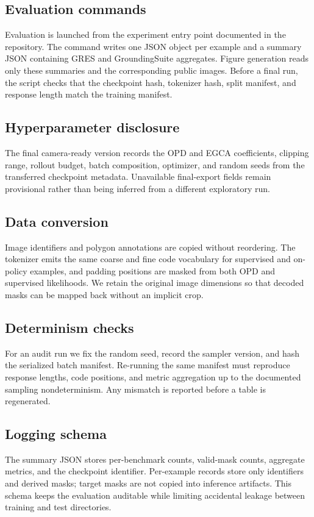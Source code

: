 \documentclass{article}
\begin{document}
\subsection{Evaluation commands}Evaluation is launched from the experiment entry point documented in the repository. The command writes one JSON object per example and a summary JSON containing GRES and GroundingSuite aggregates. Figure generation reads only these summaries and the corresponding public images. Before a final run, the script checks that the checkpoint hash, tokenizer hash, split manifest, and response length match the training manifest.
\subsection{Hyperparameter disclosure}The final camera-ready version records the OPD and EGCA coefficients, clipping range, rollout budget, batch composition, optimizer, and random seeds from the transferred checkpoint metadata. Unavailable final-export fields remain provisional rather than being inferred from a different exploratory run.
\subsection{Data conversion}Image identifiers and polygon annotations are copied without reordering. The tokenizer emits the same coarse and fine code vocabulary for supervised and on-policy examples, and padding positions are masked from both OPD and supervised likelihoods. We retain the original image dimensions so that decoded masks can be mapped back without an implicit crop.
\subsection{Determinism checks}For an audit run we fix the random seed, record the sampler version, and hash the serialized batch manifest. Re-running the same manifest must reproduce response lengths, code positions, and metric aggregation up to the documented sampling nondeterminism. Any mismatch is reported before a table is regenerated.
\subsection{Logging schema}The summary JSON stores per-benchmark counts, valid-mask counts, aggregate metrics, and the checkpoint identifier. Per-example records store only identifiers and derived masks; target masks are not copied into inference artifacts. This schema keeps the evaluation auditable while limiting accidental leakage between training and test directories.
\end{document}
